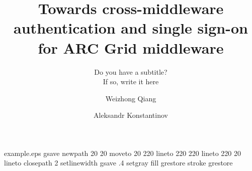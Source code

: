 %
%
%
%
%
\begin{filecontents*}{example.eps}
gsave
newpath
  20 20 moveto
  20 220 lineto
  220 220 lineto
  220 20 lineto
closepath
2 setlinewidth
gsave
  .4 setgray fill
grestore
stroke
grestore
\end{filecontents*}
%
\documentclass[twocolumn]{svjour3}         %
%
\smartqed  %
%
\usepackage{graphicx}
%
%
%
%
%


\title{Towards cross-middleware authentication and single sign-on for ARC Grid middleware
}
\subtitle{Do you have a subtitle?\\ If so, write it here}


\author{Weizhong Qiang         \and
        Aleksandr Konstantinov %
}



